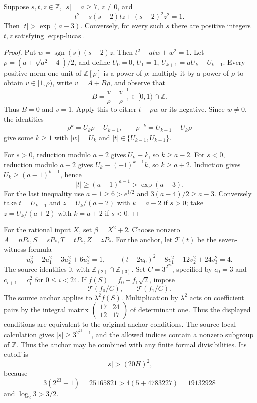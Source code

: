 \begin{lemma}\label{lem:sp-lucas}
Suppose $s,t,z\in\mathbb Z$, $|s|=a\ge7$, $z\ne0$, and
\begin{equation}\label{eq:sp-lucas}
 t^2-s(s-2)tz+(s-2)^2z^2=1.
\end{equation}
Then $|t|>\exp(a-3)$. Conversely, for every such $s$ there are
positive integers $t,z$ satisfying \eqref{eq:sp-lucas}.
\end{lemma}
\begin{proof}
Put $w=\operatorname{sgn}(s)(s-2)z$. Then
$t^2-atw+w^2=1$. Let
$\rho=(a+\sqrt{a^2-4})/2$, and define
$U_0=0$, $U_1=1$, $U_{k+1}=aU_k-U_{k-1}$.
Every positive norm-one unit of $\mathbb Z[\rho]$ is a power of
$\rho$: multiply it by a power of $\rho$ to obtain
$v\in[1,\rho)$, write $v=A+B\rho$, and observe that
\[
 B=\frac{v-v^{-1}}{\rho-\rho^{-1}}\in[0,1)\cap\mathbb Z.
\]
Thus $B=0$ and $v=1$. Apply this to either $t-\rho w$ or its
negative. Since $w\ne0$, the identities
\[
 \rho^k=U_k\rho-U_{k-1},\qquad
 \rho^{-k}=U_{k+1}-U_k\rho
\]
give some $k\ge1$ with $|w|=U_k$ and
$|t|\in\{U_{k-1},U_{k+1}\}$.

For $s>0$, reduction modulo $a-2$ gives $U_k\equiv k$, so
$k\ge a-2$. For $s<0$, reduction modulo $a+2$ gives
$U_k\equiv(-1)^{k-1}k$, so $k\ge a+2$.
Induction gives $U_k\ge(a-1)^{k-1}$, hence
\[
 |t|\ge(a-1)^{a-4}>\exp(a-3).
\]
For the last inequality use $a-1\ge6>e^{3/2}$ and
$3(a-4)/2\ge a-3$. Conversely take $t=U_{k+1}$ and
$z=U_k/(a-2)$ with $k=a-2$ if $s>0$; take
$z=U_k/(a+2)$ with $k=a+2$ if $s<0$.
\end{proof}

For the rational input $X$, set $\beta=X^2+2$. Choose nonzero
$A=nP_*,S=sP_*,T=tP_*,Z=zP_*$. For the anchor, let $\mathcal T(t)$ be the seven-witness formula
\[
 u_0^2-2u_1^2-3u_2^2+6u_3^2=1,\qquad
 (t-2u_0)^2-8v_1^2-12v_2^2+24v_3^2=4.
\]
The source identifies it with $\mathbb Z_{(2)}\cap\mathbb Z_{(3)}$.
Set $C=3^{2^{24}}$, specified by $c_0=3$ and
$c_{i+1}=c_i^2$ for $0\le i<24$. If
$f(S)=f_0+f_1\sqrt2$, impose
\[
 \mathcal T(f_0/C),\qquad
 \mathcal T(f_1/C).
\]
The source anchor applies to $\lambda^2 f(S)$. Multiplication by
$\lambda^2$ acts on coefficient pairs by the integral matrix
$\left(\begin{smallmatrix}17&24\\12&17\end{smallmatrix}\right)$
of determinant one. Thus the displayed conditions are equivalent to
the original anchor conditions. The source local
calculation gives $|s|\ge3^{2^{23}-1}$, and the allowed indices
contain a nonzero subgroup of $\mathbb Z$. Thus the anchor may be
combined with any finite formal divisibilities. Its cutoff is
\begin{equation}\label{eq:sp-cutoff}
 |s|>(20H)^2,
\end{equation}
because
\[
 3(2^{23}-1)=25165821>4(5+4783227)=19132928
\]
and $\log_2 3>3/2$.

